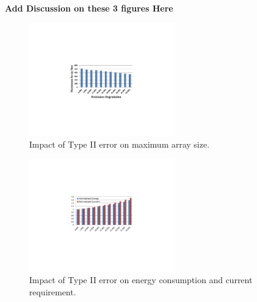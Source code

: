 \textbf{Add Discussion on these 3 figures Here}



\begin{figure}[!t]
\centering
    \includegraphics[width=2.5in]{./fig/size.pdf}
\caption{Impact of Type II error on maximum array size.}
\label{fig:size}
\end{figure}

\begin{figure}[!t]
\centering
    \includegraphics[width=2.5in]{./fig/EC.pdf}
\caption{Impact of Type II error on energy consumption and current requirement.}
\label{fig:EC}
\end{figure}
